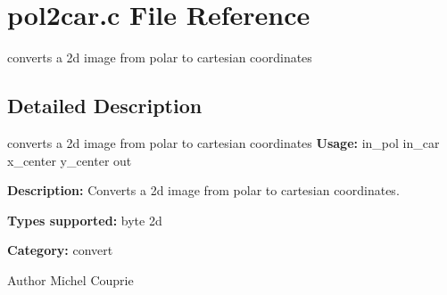 \section{pol2car.c File Reference}
\label{pol2car_8c}


converts a 2d image from polar to cartesian coordinates  




\subsection{Detailed Description}
converts a 2d image from polar to cartesian coordinates {\bfseries Usage:} in\_\-pol in\_\-car x\_\-center y\_\-center out

{\bfseries Description:} Converts a 2d image from polar to cartesian coordinates.

{\bfseries Types supported:} byte 2d

{\bfseries Category:} convert

\begin{DoxyAuthor}{Author}
Michel Couprie 
\end{DoxyAuthor}
